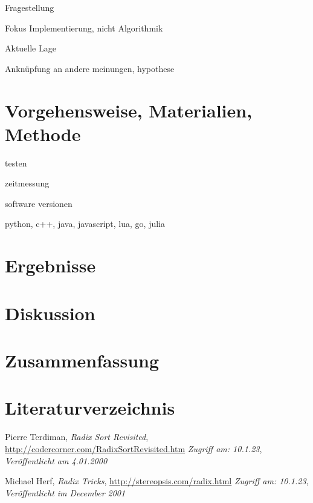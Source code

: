 \documentclass[10pt,a4paper]{article}
\begin{document}
Fragestellung

Fokus Implementierung, nicht Algorithmik

Aktuelle Lage

Anknüpfung an andere meinungen, hypothese

\clearpage
\section*{Vorgehensweise, Materialien, Methode}

testen

zeitmessung

\cite{terdiman2000}


software versionen

python, c++, java, javascript, lua, go, julia



\clearpage
\section*{Ergebnisse}
\clearpage
\section*{Diskussion}
\clearpage
\section*{Zusammenfassung}
\clearpage
\section*{Literaturverzeichnis}

\begin{thebibliography}{10}
        Pierre Terdiman,
        \textit{Radix Sort Revisited},
        \url{http://codercorner.com/RadixSortRevisited.htm}
        \textit{Zugriff am: 10.1.23},
        \textit{Veröffentlicht am 4.01.2000}
    
        Michael Herf,
        \textit{Radix Tricks},
        \url{http://stereopsis.com/radix.html}
        \textit{Zugriff am: 10.1.23},
        \textit{Veröffentlicht im December 2001}

\end{thebibliography}
\end{document}
